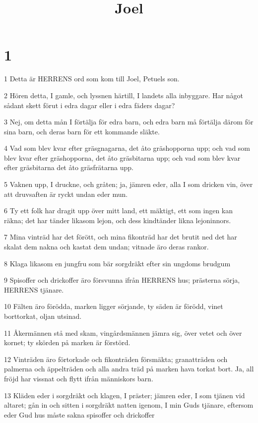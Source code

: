 

\title{Joel}


\chapter{1}

\par 1 Detta är HERRENS ord som kom till Joel, Petuels son.
\par 2 Hören detta, I gamle, och lyssnen härtill, I landets alla inbyggare. Har något sådant skett förut i edra dagar eller i edra fäders dagar?
\par 3 Nej, om detta mån I förtälja för edra barn, och edra barn må förtälja därom för sina barn, och deras barn för ett kommande släkte.
\par 4 Vad som blev kvar efter gräsgnagarna, det åto gräshopporna upp; och vad som blev kvar efter gräshopporna, det åto gräsbitarna upp; och vad som blev kvar efter gräsbitarna det åto gräsfrätarna upp.
\par 5 Vaknen upp, I druckne, och gråten; ja, jämren eder, alla I som dricken vin, över att druvsaften är ryckt undan eder mun.
\par 6 Ty ett folk har dragit upp över mitt land, ett mäktigt, ett som ingen kan räkna; det har tänder likasom lejon, och dess kindtänder likna lejoninnors.
\par 7 Mina vinträd har det förött, och mina fikonträd har det brutit ned det har skalat dem nakna och kastat dem undan; vitnade äro deras rankor.
\par 8 Klaga likasom en jungfru som bär sorgdräkt efter sin ungdoms brudgum
\par 9 Spisoffer och drickoffer äro försvunna ifrån HERRENS hus; prästerna sörja, HERRENS tjänare.
\par 10 Fälten äro förödda, marken ligger sörjande, ty säden är förödd, vinet borttorkat, oljan utsinad.
\par 11 Åkermännen stå med skam, vingårdsmännen jämra sig, över vetet och över kornet; ty skörden på marken är förstörd.
\par 12 Vinträden äro förtorkade och fikonträden försmäkta; granatträden och palmerna och äppelträden och alla andra träd på marken hava torkat bort. Ja, all fröjd har vissnat och flytt ifrån människors barn.
\par 13 Kläden eder i sorgdräkt och klagen, I präster; jämren eder, I som tjänen vid altaret; gån in och sitten i sorgdräkt natten igenom, I min Guds tjänare, eftersom eder Gud hus måste sakna spisoffer och drickoffer
